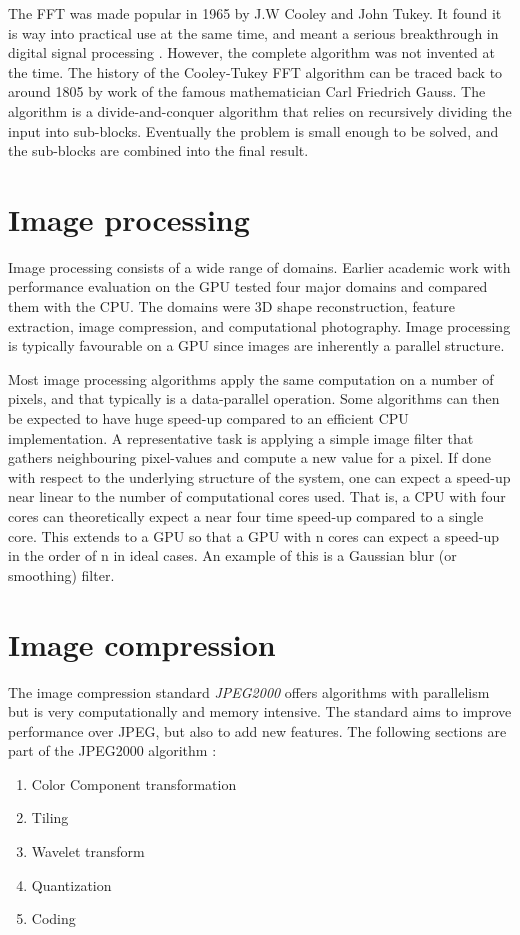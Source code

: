The FFT was made popular in 1965 \cite{cooley1965algorithm} by J.W Cooley and John Tukey. It found it is way into practical use at the same time, and meant a serious breakthrough in digital signal processing \cite{cooley1969fast, brigham1967fast}. However, the complete algorithm was not invented at the time. The history of the Cooley-Tukey \gls{FFT} algorithm can be traced back to around 1805 by work of the famous mathematician Carl Friedrich Gauss\cite{heideman1984gauss}. The algorithm is a divide-and-conquer algorithm that relies on recursively dividing the input into sub-blocks. Eventually the problem is small enough to be solved, and the sub-blocks are combined into the final result.

\section{Image processing}
Image processing consists of a wide range of domains. Earlier academic work with performance evaluation on the \gls{GPU} \cite{park2011design} tested four major domains and compared them with the \gls{CPU}. The domains were \gls{3D} shape reconstruction, feature extraction, image compression, and computational photography. Image processing is typically favourable on a \gls{GPU} since images are inherently a parallel structure.

Most image processing algorithms apply the same computation on a number of pixels, and that typically is a data-parallel operation. Some algorithms can then be expected to have huge speed-up compared to an efficient \gls{CPU} implementation. A representative task is applying a simple image filter that gathers neighbouring pixel-values and compute a new value for a pixel. If done with respect to the underlying structure of the system, one can expect a speed-up near linear to the number of computational cores used. That is, a \gls{CPU} with four cores can theoretically expect a near four time speed-up compared to a single core. This extends to a \gls{GPU} so that a \gls{GPU} with n cores can expect a speed-up in the order of n in ideal cases. An example of this is a Gaussian blur (or smoothing) filter.

\section{Image compression}
The image compression standard \emph{JPEG2000} offers algorithms with parallelism but is very computationally and memory intensive. The standard aims to improve performance over JPEG, but also to add new features. The following sections are part of the JPEG2000 algorithm \cite{christopoulos2000jpeg2000}:
\begin{enumerate}
	\item Color Component transformation
	\item Tiling
	\item Wavelet transform
	\item Quantization
	\item Coding
\end{enumerate}

